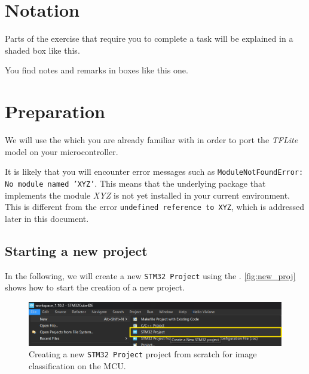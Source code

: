 \documentclass[parskip=half,notes,cadrem,toolver]{iisvlsi}
\begin{document}
\section{Notation}

\begin{studtask*}[]
Parts of the exercise that require you to complete a task will be explained in a shaded box like this.
\end{studtask*}
\begin{note*}
You find notes and remarks in boxes like this one.
\end{note*}

\section{Preparation}

We will use the \stmcubeide which you are already familiar with in order to port the \textit{TFLite} model on your microcontroller.

It is likely that you will encounter error messages such as \texttt{ModuleNotFoundError: No module named 'XYZ'}. This means that the underlying package that implements the module \textit{XYZ} is not yet installed in your current environment. This is different from the error \texttt{undefined reference to XYZ}, which is addressed later in this document.

\newpage

\subsection*{Starting a new project}

In the following, we will create a new \texttt{STM32 Project} using the \stmcubeide. \autoref{fig:new_proj} shows how to start the creation of a new project. 

\begin{figure}[H]
    \begin{center}
        \includegraphics[width=\linewidth]{new_figures/new_project.png}
        \caption{Creating a new \texttt{STM32 Project} \stmcubeide project from scratch for image classification on the MCU.}
        \label{fig:new_proj}
    \end{center}
\end{figure}
\end{document}
